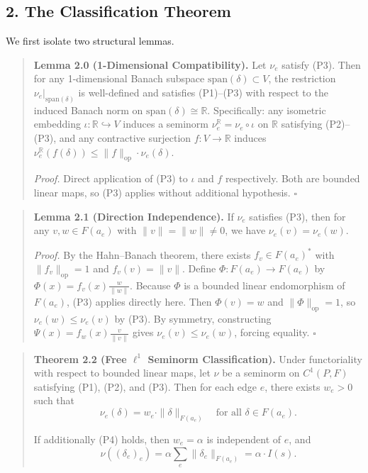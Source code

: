 \documentclass[
]{article}
\begin{document}
\subsection{2. The Classification
Theorem}\label{the-classification-theorem}

We first isolate two structural lemmas.

\begin{quote}
\textbf{Lemma 2.0 (1-Dimensional Compatibility).} Let \(\nu_e\) satisfy
(P3). Then for any 1-dimensional Banach subspace
\(\text{span}(\delta) \subset V\), the restriction
\(\nu_e|_{\text{span}(\delta)}\) is well-defined and satisfies
(P1)--(P3) with respect to the induced Banach norm on
\(\text{span}(\delta) \cong \mathbb{R}\). Specifically: any isometric
embedding \(\iota: \mathbb{R} \hookrightarrow V\) induces a seminorm
\(\nu_e^{\mathbb{R}} = \nu_e \circ \iota\) on \(\mathbb{R}\) satisfying
(P2)--(P3), and any contractive surjection \(f: V \to \mathbb{R}\)
induces
\(\nu_e^{\mathbb{R}}(f(\delta)) \leq \|f\|_{\text{op}} \cdot \nu_e(\delta)\).

\emph{Proof.} Direct application of (P3) to \(\iota\) and \(f\)
respectively. Both are bounded linear maps, so (P3) applies without
additional hypothesis. \(\square\)
\end{quote}

\begin{quote}
\textbf{Lemma 2.1 (Direction Independence).} If \(\nu_e\) satisfies
(P3), then for any \(v, w \in F(a_e)\) with \(\|v\| = \|w\| \neq 0\), we
have \(\nu_e(v) = \nu_e(w)\).

\emph{Proof.} By the Hahn--Banach theorem, there exists
\(f_v \in F(a_e)^*\) with \(\|f_v\|_{\text{op}} = 1\) and
\(f_v(v) = \|v\|\). Define \(\Phi: F(a_e) \to F(a_e)\) by
\(\Phi(x) = f_v(x) \frac{w}{\|w\|}\). Because \(\Phi\) is a bounded
linear endomorphism of \(F(a_e)\), (P3) applies directly here. Then
\(\Phi(v) = w\) and \(\|\Phi\|_{\text{op}} = 1\), so
\(\nu_e(w) \leq \nu_e(v)\) by (P3). By symmetry, constructing
\(\Psi(x) = f_w(x) \frac{v}{\|v\|}\) gives \(\nu_e(v) \leq \nu_e(w)\),
forcing equality. \(\square\)
\end{quote}

\begin{quote}
\textbf{Theorem 2.2 (Free \(\ell^1\) Seminorm Classification).} Under
functoriality with respect to bounded linear maps, let \(\nu\) be a
seminorm on \(C^1(P, F)\) satisfying (P1), (P2), and (P3). Then for each
edge \(e\), there exists \(w_e > 0\) such that
\[\nu_e(\delta) = w_e \cdot \|\delta\|_{F(a_e)} \quad \text{for all } \delta \in F(a_e).\]

If additionally (P4) holds, then \(w_e = \alpha\) is independent of
\(e\), and
\[\nu((\delta_e)_e) = \alpha \sum_{e} \|\delta_e\|_{F(a_e)} = \alpha \cdot I(s).\]
\end{quote}
\end{document}
